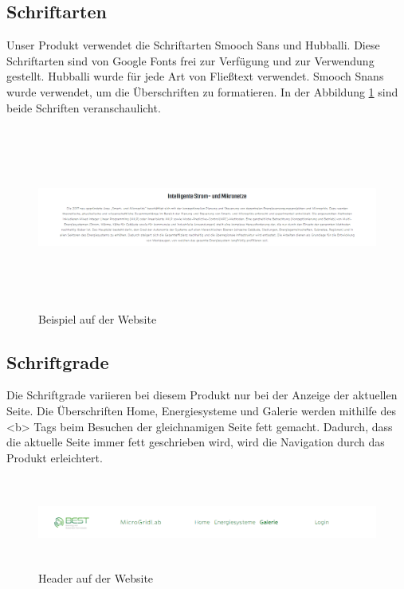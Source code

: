 \subsection{Schriftarten}
Unser Produkt verwendet die Schriftarten Smooch Sans und Hubballi. Diese Schriftarten sind von Google Fonts frei zur Verfügung und zur Verwendung gestellt. Hubballi wurde für jede Art von Fließtext verwendet. Smooch Snans wurde verwendet, um die Überschriften zu formatieren. In der Abbildung \ref{fig: Beispiel auf der Website} sind beide Schriften veranschaulicht.
\begin{figure}[h]
	\centering
	\includegraphics[height=6cm,width=15cm]{images/Beispiel_Schriftarten}
	\caption{Beispiel auf der Website}
	\label{fig: Beispiel auf der Website}
\end{figure}
\newpage
\subsection{Schriftgrade}
Die Schriftgrade variieren bei diesem Produkt nur bei der Anzeige der aktuellen Seite.
Die Überschriften Home, Energiesysteme und Galerie werden mithilfe des <b> Tags beim Besuchen der gleichnamigen Seite fett gemacht. Dadurch, dass die aktuelle Seite immer fett geschrieben wird, wird die Navigation durch das Produkt erleichtert.
\begin{figure}[h]
	\centering
	\includegraphics[height=3cm,width=20cm]{images/Header}
	\caption{Header auf der Website}
	\label{fig: Header}
\end{figure}

